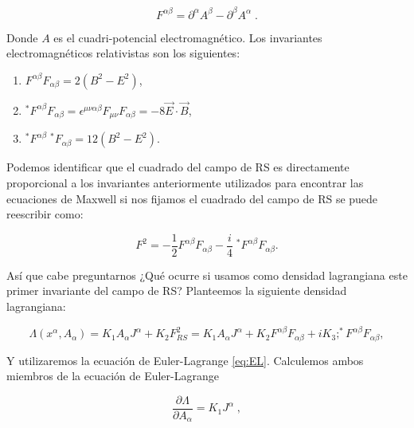            \begin{equation}
                F^{\alpha\beta} = \partial^{\alpha}A^{\beta} - \partial^{\beta}A^{\alpha}\;.
            \end{equation}

        Donde $A$ es el cuadri-potencial electromagnético. Los invariantes electromagnéticos relativistas son los siguientes:

            \begin{enumerate}
                \item $F^{\alpha\beta}F_{\alpha\beta} = 2(B^2-E^2)$,

                \item $^*F^{\alpha\beta}F_{\alpha\beta}  =\epsilon^{\mu\nu\alpha\beta}F_{\mu\nu}F_{\alpha\beta} = -8\Vec{E}\cdot\Vec{B}$, 

                \item
                $^*F^{\alpha\beta}\;^*F_{\alpha\beta} = 12(B^2-E^2)$.
            \end{enumerate}

        Podemos identificar que el cuadrado del campo de RS es directamente proporcional a los invariantes anteriormente utilizados para encontrar las ecuaciones de Maxwell si nos fijamos el cuadrado del campo de RS se puede reescribir como:

        \begin{equation}
            F^2 = -\frac{1}{2}F^{\alpha\beta}F_{\alpha\beta} - \frac{i}{4}\;^*F^{\alpha\beta}F_{\alpha\beta}.
        \end{equation}

        Así que cabe preguntarnos ¿Qué ocurre si usamos como densidad lagrangiana este primer invariante del campo de RS? Planteemos la siguiente densidad lagrangiana:

        \begin{equation}
            \Lambda(x^{\alpha},A_{\alpha}) = K_1A_{\alpha}J^{\alpha} + K_2F_{RS}^2 = K_1A_{\alpha}J^{\alpha} +K_2F^{\alpha\beta}F_{\alpha\beta} + iK_3;^*F^{\alpha\beta}F_{\alpha\beta},
        \end{equation}


        Y utilizaremos la ecuación de Euler-Lagrange \ref{eq:EL}. Calculemos ambos miembros de la ecuación de Euler-Lagrange

        \begin{equation*}
            \frac{\partial \Lambda}{\partial A_{\alpha}} = K_1J^{\alpha}\;,
        \end{equation*}

